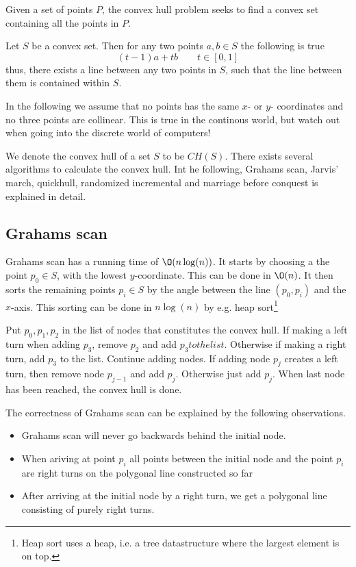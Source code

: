 \documentclass[10pt]{article}
\begin{document}
Given a set of points $P$, the convex hull problem seeks to find a convex set containing all the points in $P$.

Let $S$ be a convex set. Then for any two points $a,b \in S$ the following is true
\begin{equation}
  (t-1)a+tb \qquad t \in [0,1]
\end{equation}
thus, there exists a line between any two points in $S$, such that the line between them is contained within $S$.

In the following we assume that no points has the same $x$- or $y$- coordinates and no three points are collinear. This is true in the continous world, but watch out when going into the discrete world of computers!

We denote the convex hull of a set $S$ to be $CH(S)$. There exists several algorithms to calculate the convex hull. Int he following, Grahams scan, Jarvis' march, quickhull, randomized incremental and marriage before conquest is explained in detail.

\subsection{Grahams scan} %
\label{sub:grahams_scan}
Grahams scan has a running time of $\O(n\log(n))$. It starts by choosing a the point $p_0 \in S$, with the lowest $y$-coordinate. This can be done in $\O(n)$. It then sorts the remaining points $p_i \in S$ by the angle between the line $(p_0, p_i)$ and the $x$-axis. This sorting can be done in $n \log(n)$ by e.g. heap sort\footnote{Heap sort uses a heap, i.e. a tree datastructure where the largest element is on top.} 

Put $p_0, p_1, p_2$ in the list of nodes that constitutes the convex hull. If making a left turn when adding $p_3$, remove $p_2$ and add $p_3 to the list$. Otherwise if making a right turn, add $p_3$ to the list. Continue adding nodes. If adding node $p_j$ creates a left turn, then remove node $p_{j-1}$ and add $p_j$. Otherwise just add $p_j$. When last node has been reached, the convex hull is done.

The correctness of Grahams scan can be explained by the following observations. 

\begin{itemize}
  \item Grahams scan will never go backwards behind the initial node. 
  \item When ariving at point $p_i$ all points between the initial node and the point $p_i$ are right turns on the polygonal line constructed so far
  \item After arriving at the initial node by a right turn, we get a polygonal line consisting of purely right turns. 
\end{itemize}
\end{document}
